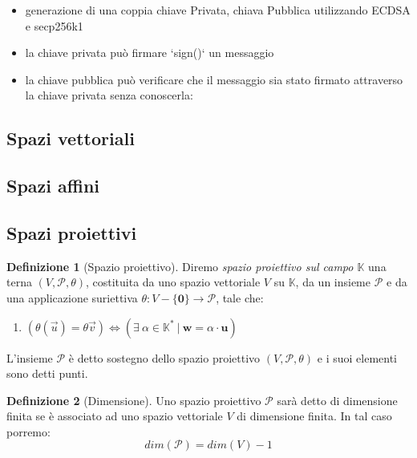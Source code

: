 \documentclass{book}
\theoremstyle{definition}
\newtheorem{definizione}{Definizione}
\newcommand{\Spr}{\mathscr{P}}
\begin{document}
\begin{itemize}
    \item generazione di una coppia chiave Privata, chiava Pubblica utilizzando ECDSA e secp256k1
    \item la chiave privata può firmare `sign()` un messaggio
    \item la chiave pubblica può verificare che il messaggio sia stato firmato attraverso la chiave privata senza conoscerla: %
\end{itemize}

\subsection{Spazi vettoriali}

\subsection{Spazi affini}

\subsection{Spazi proiettivi}

\medskip

\begin{definizione}[Spazio proiettivo]
    Diremo \emph{spazio proiettivo sul campo $\mathbb{K}$} una terna $(V, \Spr, \theta)$, costituita da uno spazio vettoriale
    $V$ su $\mathbb{K}$, da un insieme $\Spr$ e da una applicazione suriettiva $\theta: V - \{\mathbf{0}\} \rightarrow \Spr$, tale che:
    
    \begin{enumerate}[label=(SP\arabic*.),itemindent=*]
        \item $(\theta(\vec{u}) = \theta{\vec{v}}) \iff (\exists \ \alpha \in \mathbb{K}^{*} \ | \ \mathbf{w} = \alpha \cdot \mathbf{u})$
    \end{enumerate}

    L'insieme $\Spr$ è detto sostegno dello spazio proiettivo $(V, \Spr, \theta)$ e i suoi elementi sono detti punti.

\end{definizione}

\begin{definizione}[Dimensione]
    Uno spazio proiettivo $\Spr$ sarà detto di dimensione finita se è associato ad uno spazio vettoriale $V$ di dimensione finita.
    In tal caso porremo:
    \[
        dim(\Spr) = dim(V) -1
    \]
\end{definizione}
\end{document}

